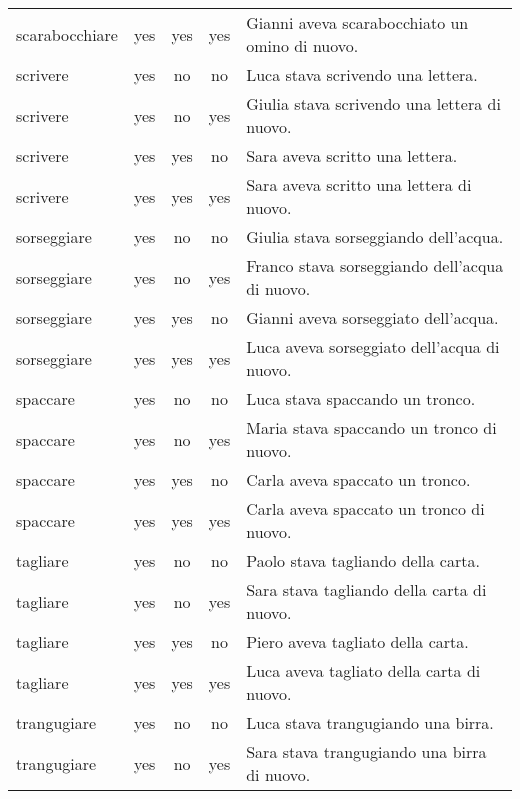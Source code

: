 \begin{longtable}{l|ccc|p{5cm}}
scarabocchiare & yes  & yes        & yes       & Gianni aveva scarabocchiato un omino di nuovo.      \\
scrivere       & yes  & no         & no        & Luca stava scrivendo una lettera.                   \\
scrivere       & yes  & no         & yes       & Giulia stava scrivendo una lettera di nuovo.        \\
scrivere       & yes  & yes        & no        & Sara aveva scritto una lettera.                     \\
scrivere       & yes  & yes        & yes       & Sara aveva scritto una lettera di nuovo.            \\
sorseggiare    & yes  & no         & no        & Giulia stava sorseggiando dell’acqua.               \\
sorseggiare    & yes  & no         & yes       & Franco stava sorseggiando dell’acqua di nuovo.      \\
sorseggiare    & yes  & yes        & no        & Gianni aveva sorseggiato dell’acqua.                \\
sorseggiare    & yes  & yes        & yes       & Luca aveva sorseggiato dell’acqua di nuovo.         \\
spaccare       & yes  & no         & no        & Luca stava spaccando un tronco.                     \\
spaccare       & yes  & no         & yes       & Maria stava spaccando un tronco di nuovo.           \\
spaccare       & yes  & yes        & no        & Carla aveva spaccato un tronco.                     \\
spaccare       & yes  & yes        & yes       & Carla aveva spaccato un tronco di nuovo.            \\
tagliare       & yes  & no         & no        & Paolo stava tagliando della carta.                  \\
tagliare       & yes  & no         & yes       & Sara stava tagliando della carta di nuovo.          \\
tagliare       & yes  & yes        & no        & Piero aveva tagliato della carta.                   \\
tagliare       & yes  & yes        & yes       & Luca aveva tagliato della carta di nuovo.           \\
trangugiare    & yes  & no         & no        & Luca stava trangugiando una birra.                  \\
trangugiare    & yes  & no         & yes       & Sara stava trangugiando una birra di nuovo.         \\

\end{longtable}
